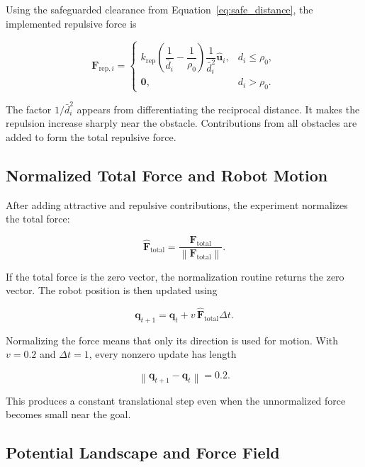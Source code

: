 \documentclass[10pt,twocolumn,a4paper]{article}
\begin{document}
Using the safeguarded clearance from Equation~\eqref{eq:safe_distance},
the implemented repulsive force is

\begin{equation}
\mathbf{F}_{\mathrm{rep},i}
=
\begin{cases}

k_{\mathrm{rep}}
\left(
\dfrac{1}{\bar d_i}
-
\dfrac{1}{\rho_0}
\right)
\dfrac{1}{\bar d_i^2}
\hat{\mathbf{u}}_i,
& d_i\leq\rho_0,\\[3mm]

\mathbf{0},
& d_i>\rho_0.
\end{cases}
\label{eq:repulsive_force}
\end{equation}

The factor $1/\bar d_i^2$ appears from differentiating the reciprocal
distance. It makes the repulsion increase sharply near the obstacle.
Contributions from all obstacles are added to form the total repulsive
force.

\subsection{Normalized Total Force and Robot Motion}

After adding attractive and repulsive contributions, the experiment
normalizes the total force:

\begin{equation}
    \hat{\mathbf{F}}_{\mathrm{total}}
    =
    \frac{\mathbf{F}_{\mathrm{total}}}
    {\left\|\mathbf{F}_{\mathrm{total}}\right\|}.
    \label{eq:normalized_force}
\end{equation}

If the total force is the zero vector, the normalization routine returns the
zero vector. The robot position is then updated using

\begin{equation}
    \mathbf{q}_{t+1}
    =
    \mathbf{q}_t
    +
    v\,\hat{\mathbf{F}}_{\mathrm{total}}\Delta t.
    \label{eq:motion_update}
\end{equation}

Normalizing the force means that only its direction is used for motion. With
$v=0.2$ and $\Delta t=1$, every nonzero update has length

\[
    \left\|\mathbf{q}_{t+1}-\mathbf{q}_t\right\|=0.2.
\]

This produces a constant translational step even when the unnormalized
force becomes small near the goal.

\subsection{Potential Landscape and Force Field}
\end{document}
